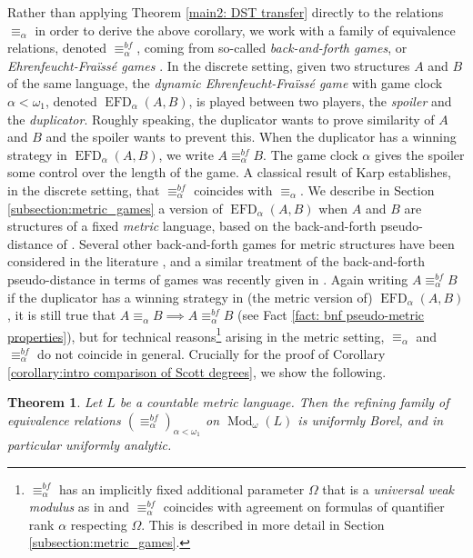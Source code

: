 \documentclass[12pt]{amsart}
\newtheorem{main}{Theorem}
\DeclareMathOperator{\EFD}{EFD}
\DeclareMathOperator{\Mod}{Mod}
\begin{document}
Rather than applying Theorem \ref{main2: DST transfer} directly to the relations $\equiv_\alpha$ in order to derive the above corollary, we work with a family of equivalence relations, denoted $\equiv_\alpha^{bf}$, coming from so-called \emph{back-and-forth games}, or \emph{Ehrenfeucht-Fra\"iss\'e games} \cite{fraisse1955quelques, ehrenfeucht1957application}. In the discrete setting, given two structures $A$ and $B$ of the same language, the \emph{dynamic Ehrenfeucht-Fra\"iss\'e game} with game clock $\alpha<\omega_1$, denoted $\EFD_\alpha(A,B)$, is played between two players, the \emph{spoiler} and the \emph{duplicator}. Roughly speaking, the {duplicator} wants to prove similarity of $A$ and $B$ and the spoiler wants to prevent this. When the duplicator has a winning strategy in $\EFD_\alpha(A,B)$, we write $A\equiv_\alpha^{bf} B$. The game clock $\alpha$ gives the spoiler some control over the length of the game. A classical result of Karp \cite{KARP2014407} establishes, in the discrete setting, that $\equiv_\alpha^{bf}$ coincides with $\equiv_\alpha$. 
We describe in Section \ref{subsection:metric_games} a version of $\EFD_\alpha(A,B)$ when $A$ and $B$ are structures of a fixed \emph{metric} language, based on the back-and-forth pseudo-distance of \cite{yaacov2017metric}. Several other back-and-forth games for metric structures have been considered in the literature \cite{games_on_AF_algebras, hanson2023approximate, HIRVONEN2022103123}, and a similar treatment of the back-and-forth pseudo-distance in terms of games was recently given in \cite{hirvonen2024ehrenfeuchtfraissegamescontinuousfirstorder}.  
Again writing $A\equiv_\alpha^{bf} B$ if the duplicator has a winning strategy in (the metric version of) $\EFD_\alpha(A,B)$, it is still true that $A\equiv_\alpha B\implies A\equiv_\alpha^{bf} B$ (see Fact \ref{fact: bnf pseudo-metric properties}), but for technical reasons\footnote{ $\equiv_\alpha^{bf}$ has an implicitly fixed additional parameter $\Omega$ that is a \textit{universal weak modulus} as in \cite[Section 5]{yaacov2017metric} and $\equiv_\alpha^{bf}$ coincides with agreement on formulas of quantifier rank $\alpha$ respecting $\Omega$. This is described in more detail in Section \ref{subsection:metric_games}.} arising in the metric setting, $\equiv_\alpha$ and $\equiv_\alpha^{bf}$ do not coincide in general. 
Crucially for the proof of Corollary \ref{corollary:intro comparison of Scott degrees}, we show the following.
\begin{main}\label{theorem: intro uniform Borelness of games}
    Let $L$ be a countable metric language. Then the refining family of equivalence relations $(\equiv_\alpha^{bf})_{\alpha<\omega_1}$ on $\Mod_\omega(L)$
    is uniformly Borel, and in particular uniformly analytic.
\end{main}
\end{document}
